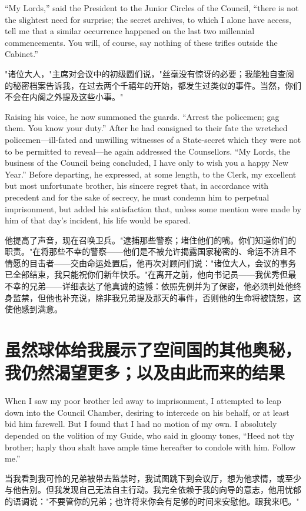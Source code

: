 \documentclass[12pt,UTF8]{ctexbook}
\begin{document}
``My Lords,'' said the President to the Junior Circles of the Council, ``there is not the slightest need for surprise; the secret archives, to which I alone have access, tell me that a similar occurrence happened on the last two millennial commencements. You will, of course, say nothing of these trifles outside the Cabinet.''

"诸位大人，"主席对会议中的初级圆们说，"丝毫没有惊讶的必要；我能独自查阅的秘密档案告诉我，在过去两个千禧年的开始，都发生过类似的事件。当然，你们不会在内阁之外提及这些小事。"

Raising his voice, he now summoned the guards. ``Arrest the policemen; gag them. You know your duty.'' After he had consigned to their fate the wretched policemen---ill-fated and unwilling witnesses of a State-secret which they were not to be permitted to reveal---he again addressed the Counsellors. ``My Lords, the business of the Council being concluded, I have only to wish you a happy New Year.'' Before departing, he expressed, at some length, to the Clerk, my excellent but most unfortunate brother, his sincere regret that, in accordance with precedent and for the sake of secrecy, he must condemn him to perpetual imprisonment, but added his satisfaction that, unless some mention were made by him of that day's incident, his life would be spared.

他提高了声音，现在召唤卫兵。"逮捕那些警察；堵住他们的嘴。你们知道你们的职责。"在将那些不幸的警察——他们是不被允许揭露国家秘密的、命运不济且不情愿的目击者——交由命运处置后，他再次对顾问们说："诸位大人，会议的事务已全部结束，我只能祝你们新年快乐。"在离开之前，他向书记员——我优秀但最不幸的兄弟——详细表达了他真诚的遗憾：依照先例并为了保密，他必须判处他终身监禁，但他也补充说，除非我兄弟提及那天的事件，否则他的生命将被饶恕，这使他感到满意。

\chapter{虽然球体给我展示了空间国的其他奥秘，我仍然渴望更多；以及由此而来的结果}

When I saw my poor brother led away to imprisonment, I attempted to leap down into the Council Chamber, desiring to intercede on his behalf, or at least bid him farewell. But I found that I had no motion of my own. I absolutely depended on the volition of my Guide, who said in gloomy tones, ``Heed not thy brother; haply thou shalt have ample time hereafter to condole with him. Follow me.''

当我看到我可怜的兄弟被带去监禁时，我试图跳下到会议厅，想为他求情，或至少与他告别。但我发现自己无法自主行动。我完全依赖于我的向导的意志，他用忧郁的语调说："不要管你的兄弟；也许将来你会有足够的时间来安慰他。跟我来吧。"
\end{document}
